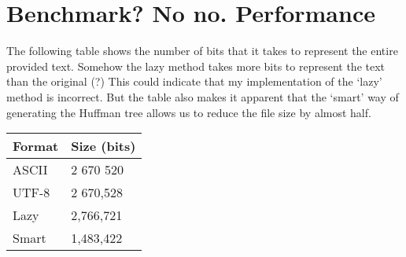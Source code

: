 \section{Benchmark? No no. Performance}
The following table shows the number of bits that it takes to represent the entire provided text. Somehow the lazy method takes more bits to represent the text than the original (?)
This could indicate that my implementation of the `lazy' method is incorrect. But the table also makes it apparent that the `smart' way of generating the Huffman tree allows us to reduce the file size by almost half. 

\begin{table}[h!]
\centering
\begin{tabular}{|l|l|}
\hline
\textbf{Format} & \textbf{Size (bits)} \\ \hline
ASCII           & 2 670 520            \\ \hline
UTF-8           & 2 670,528            \\ \hline
Lazy            & 2,766,721            \\ \hline
Smart           & 1,483,422            \\ \hline
\end{tabular}
\end{table}